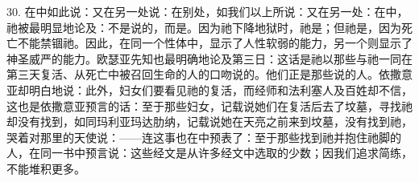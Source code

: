 30. 在中如此说：\newline{}\newline{}\newline{}又在另一处说：\newline{}\newline{}\newline{}在别处，如我们以上所说：\newline{}\newline{}\newline{}又在另一处：\newline{}\newline{}\newline{}在中，祂被最明显地论及：\newline{}\newline{}\newline{}不是说的，而是。因为祂下降地狱时，祂是；但祂是，因为死亡不能禁锢祂。因此，在同一个性体中，显示了人性软弱的能力，另一个则显示了神圣威严的能力。\newline{}\newline{}欧瑟亚先知也最明确地论及第三日：\newline{}\newline{}\newline{}这话是祂以那些与祂一同在第三天复活、从死亡中被召回生命的人的口吻说的。他们正是那些说的人。\newline{}\newline{}依撒意亚却明白地说：\newline{}\newline{}\newline{}此外，妇女们要看见祂的复活，而经师和法利塞人及百姓却不信，这也是依撒意亚预言的话：\newline{}\newline{}\newline{}至于那些妇女，记载说她们在复活后去了坟墓，寻找祂却没有找到，如同玛利亚玛达肋纳，记载说她在天亮之前来到坟墓，没有找到祂，哭着对那里的天使说：——连这事也在中预表了：\newline{}\newline{}\newline{}至于那些找到祂并抱住祂脚的人，在同一书中预言说：\newline{}\newline{}\newline{}这些经文是从许多经文中选取的少数；因我们追求简练，不能堆积更多。\par

